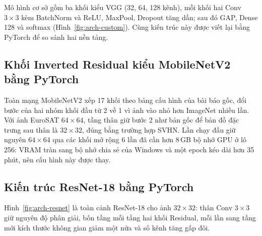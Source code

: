 Mô hình cơ sở gồm ba khối kiểu VGG (32, 64, 128 kênh), mỗi khối hai Conv $3{\times}3$ kèm BatchNorm \cite{ioffe2015} và
ReLU, MaxPool, Dropout tăng dần; sau đó GAP, Dense 128 và softmax (Hình~\ref{fig:arch-custom}). Cùng kiến trúc này được viết
lại bằng PyTorch để so sánh hai nền tảng.



\subsection{Khối Inverted Residual kiểu MobileNetV2 bằng PyTorch}


Toàn mạng MobileNetV2 xếp 17 khối theo bảng cấu hình của bài báo gốc, đổi bước của hai nhóm khối đầu từ 2 về 1 vì ảnh vào
nhỏ hơn ImageNet nhiều lần. Với ảnh EuroSAT $64{\times}64$, tầng thân giữ bước 2 như bản gốc để bản đồ đặc trưng sau thân là
$32{\times}32$, đúng bằng trường hợp SVHN. Lần chạy đầu giữ nguyên $64{\times}64$ qua các khối mở rộng 6 lần đã cần hơn
8\,GB bộ nhớ GPU ở lô 256: VRAM tràn sang bộ nhớ chia sẻ của Windows và một epoch kéo dài hơn 35 phút, nên cấu hình này được
thay.

\subsection{Kiến trúc ResNet-18 bằng PyTorch}

Hình~\ref{fig:arch-resnet} là toàn cảnh ResNet-18 cho ảnh $32{\times}32$: thân Conv $3{\times}3$ giữ nguyên độ phân giải,
bốn tầng mỗi tầng hai khối Residual, mỗi lần sang tầng mới kích thước không gian giảm một nửa và số kênh tăng gấp đôi.



